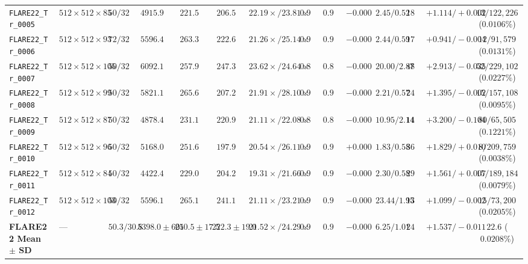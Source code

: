 \documentclass[10pt,twocolumn]{article}
\begin{document}
\begin{table}[t]
{\begin{tabular}{llcccccccccccc}
\texttt{FLARE22\_Tr\_0005} & $512 \times 512 \times 85$ & $50 / 32$ & $4915.9$ & $221.5$ & $206.5$ & $22.19\times / 23.81\times$ & $0.962419$ & $0.962391$ & $-0.000028$ & $2.45 / 0.52$ & $189.61$ & $+1.114 / +0.002$ & $13 / 122,226$ ($0.0106\%$) \\
\texttt{FLARE22\_Tr\_0006} & $512 \times 512 \times 93$ & $72 / 32$ & $5596.4$ & $263.3$ & $222.6$ & $21.26\times / 25.14\times$ & $0.960910$ & $0.960888$ & $-0.000022$ & $2.44 / 0.59$ & $174.83$ & $+0.941 / -0.004$ & $12 / 91,579$ ($0.0131\%$) \\
\texttt{FLARE22\_Tr\_0007} & $512 \times 512 \times 105$ & $50 / 32$ & $6092.1$ & $257.9$ & $247.3$ & $23.62\times / 24.64\times$ & $0.845178$ & $0.845134$ & $-0.000044$ & $20.00 / 2.87$ & $481.72$ & $+2.913 / -0.035$ & $52 / 229,102$ ($0.0227\%$) \\
\texttt{FLARE22\_Tr\_0008} & $512 \times 512 \times 99$ & $50 / 32$ & $5821.1$ & $265.6$ & $207.2$ & $21.91\times / 28.10\times$ & $0.958981$ & $0.958978$ & $-0.000003$ & $2.21 / 0.57$ & $244.87$ & $+1.395 / -0.002$ & $15 / 157,108$ ($0.0095\%$) \\
\texttt{FLARE22\_Tr\_0009} & $512 \times 512 \times 87$ & $50 / 32$ & $4878.4$ & $231.1$ & $220.9$ & $21.11\times / 22.08\times$ & $0.828880$ & $0.828552$ & $-0.000328$ & $10.95 / 2.14$ & $146.54$ & $+3.200 / -0.104$ & $80 / 65,505$ ($0.1221\%$) \\
\texttt{FLARE22\_Tr\_0010} & $512 \times 512 \times 96$ & $50 / 32$ & $5168.0$ & $251.6$ & $197.9$ & $20.54\times / 26.11\times$ & $0.966501$ & $0.966511$ & $+0.000010$ & $1.83 / 0.58$ & $367.51$ & $+1.829 / +0.010$ & $8 / 209,759$ ($0.0038\%$) \\
\texttt{FLARE22\_Tr\_0011} & $512 \times 512 \times 84$ & $50 / 32$ & $4422.4$ & $229.0$ & $204.2$ & $19.31\times / 21.66\times$ & $0.962932$ & $0.962930$ & $-0.000002$ & $2.30 / 0.58$ & $292.36$ & $+1.561 / +0.007$ & $15 / 189,184$ ($0.0079\%$) \\
\texttt{FLARE22\_Tr\_0012} & $512 \times 512 \times 103$ & $50 / 32$ & $5596.1$ & $265.1$ & $241.1$ & $21.11\times / 23.21\times$ & $0.904354$ & $0.904320$ & $-0.000034$ & $23.44 / 1.95$ & $130.75$ & $+1.099 / -0.002$ & $15 / 73,200$ ($0.0205\%$) \\
\textbf{FLARE22 Mean $\pm$ SD} & --- & $50.3 / 30.8$ & $5398.0 \pm 601$ & $250.5 \pm 17.5$ & $222.3 \pm 19.0$ & $\mathbf{21.52\times} / \mathbf{24.29\times}$ & $0.936015$ & $\mathbf{0.935974}$ & $-0.000041$ & $\mathbf{6.25 / 1.01}$ & $240.06$ & $\mathbf{+1.537 / -0.011}$ & $\mathbf{22.6}$ ($\mathbf{0.0208\%}$) \\
\bottomrule
\end{tabular}%
}
\end{table}
\end{document}
